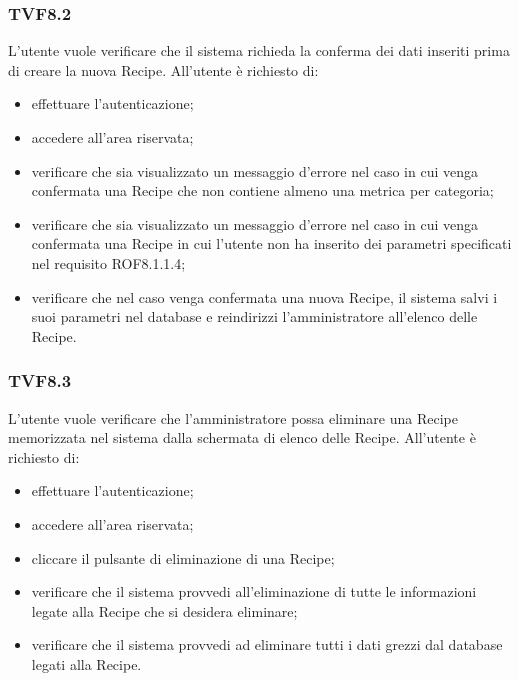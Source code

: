 		\subsubsection{TVF8.2}
			L'utente vuole verificare che il sistema richieda la conferma dei dati inseriti prima di creare la nuova Recipe. All'utente è richiesto di:
			\begin{itemize}
				\item effettuare l'autenticazione;
				\item accedere all'area riservata;
				\item verificare che sia visualizzato un messaggio d'errore nel caso in cui venga confermata una Recipe che non contiene almeno una metrica per categoria;
				\item verificare che sia visualizzato un messaggio d'errore nel caso in cui venga confermata una Recipe in cui l'utente non ha inserito dei parametri specificati nel requisito ROF8.1.1.4;
				\item verificare che nel caso venga confermata una nuova Recipe, il sistema salvi i suoi parametri nel database e reindirizzi l'amministratore all'elenco delle Recipe.
			\end{itemize}
			
		\subsubsection{TVF8.3}
			L'utente vuole verificare che l'amministratore possa eliminare una Recipe memorizzata nel sistema dalla schermata di elenco delle Recipe. All'utente è richiesto di:
			\begin{itemize}
				\item effettuare l'autenticazione;
				\item accedere all'area riservata;
				\item cliccare il pulsante di eliminazione di una Recipe;
				\item verificare che il sistema provvedi all'eliminazione di tutte le informazioni legate alla Recipe che si desidera eliminare;
				\item verificare che il sistema provvedi ad eliminare tutti i dati grezzi dal database legati alla Recipe.
			\end{itemize}
			
